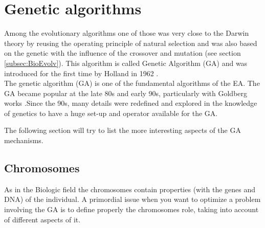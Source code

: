 \section{Genetic algorithms} \label{sec:GAdetail}
Among the evolutionary algorithms one of those was very close to the Darwin theory by reusing the operating principle of natural selection and was also based on the genetic with the influence of the crossover and mutation (see section \ref{subsec:BioEvolv}). This algorithm is called Genetic Algorithm (GA) and was introduced for the first time by Holland in 1962 \cite{111*Holland1962}. \\
The genetic algorithm (GA) is one of the fundamental algorithms of the EA.
The GA became popular at the late 80s and early 90s, particularly with Goldberg works \cite{112*goldberg1989}.Since the 90s, many details were redefined and explored in the knowledge of genetics to have a huge set-up and operator available for the GA.
  
The following section will try to list the more interesting aspects of the GA mechanisms. 
 
%


\subsection{Chromosomes} \label{par:Chromosomes}
As in the Biologic field the chromosomes contain properties (with the genes and DNA) of the individual.
A primordial issue when you want to optimize a problem involving the GA is to define properly the chromosomes role, taking into account of different aspects of it.

